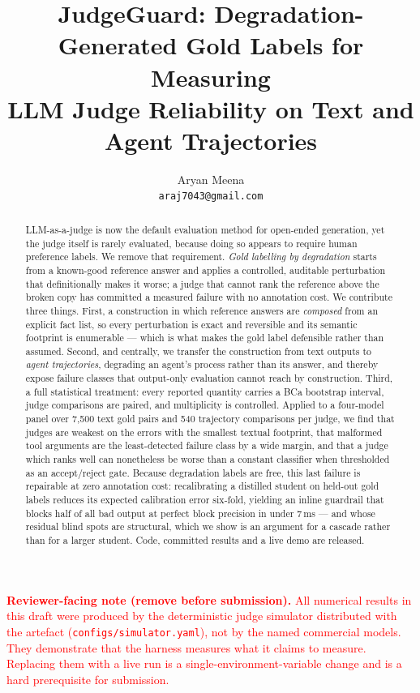 \documentclass[10pt,letterpaper]{article}
\title{\textbf{JudgeGuard: Degradation-Generated Gold Labels for Measuring\\
LLM Judge Reliability on Text and Agent Trajectories}}
\author{Aryan Meena\\\texttt{araj7043@gmail.com}}
\date{}
\newcommand{\simnote}[1]{\textcolor{red}{#1}}
\begin{document}
\maketitle

\begin{abstract}
LLM-as-a-judge is now the default evaluation method for open-ended generation, yet the judge
itself is rarely evaluated, because doing so appears to require human preference labels. We
remove that requirement. \emph{Gold labelling by degradation} starts from a known-good reference
answer and applies a controlled, auditable perturbation that definitionally makes it worse; a
judge that cannot rank the reference above the broken copy has committed a measured failure with
no annotation cost. We contribute three things. First, a construction in which reference answers
are \emph{composed} from an explicit fact list, so every perturbation is exact and reversible and
its semantic footprint is enumerable --- which is what makes the gold label defensible rather
than assumed. Second, and centrally, we transfer the construction from text outputs to
\emph{agent trajectories}, degrading an agent's process rather than its answer, and thereby
expose failure classes that output-only evaluation cannot reach by construction. Third, a full
statistical treatment: every reported quantity carries a BCa bootstrap interval, judge
comparisons are paired, and multiplicity is controlled. Applied to a four-model panel over 7{,}500
text gold pairs and 540 trajectory comparisons per judge, we find that judges are weakest on the
errors with the smallest textual footprint, that malformed tool arguments are the least-detected
failure class by a wide margin, and that a judge which ranks well can nonetheless be worse than a
constant classifier when thresholded as an accept/reject gate. Because degradation labels are free,
this last failure is repairable at zero annotation cost: recalibrating a distilled student on
held-out gold labels reduces its expected calibration error six-fold, yielding an inline guardrail
that blocks half of all bad output at perfect block precision in under 7\,ms --- and whose
residual blind spots are structural, which we show is an argument for a cascade rather than for a
larger student. Code, committed results and a live demo are released.
\end{abstract}

\simnote{\textbf{Reviewer-facing note (remove before submission).} All numerical results in this
draft were produced by the deterministic judge simulator distributed with the artefact
(\texttt{configs/simulator.yaml}), not by the named commercial models. They demonstrate that the
harness measures what it claims to measure. Replacing them with a live run is a
single-environment-variable change and is a hard prerequisite for submission.}
\end{document}
